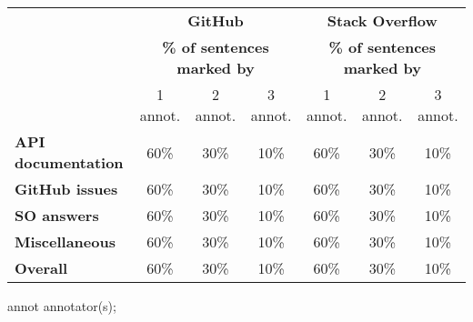 \begin{table}[H]
\centering    
\caption{}
\label{tbl:corpus-annotation-overlap-by-task}
\begin{scriptsize}
\begin{threeparttable}
\begin{tabular}{lcccccc}



& \multicolumn{3}{c}{\textbf{GitHub}} & \multicolumn{3}{c}{\textbf{Stack Overflow}} \\

& \multicolumn{3}{c}{\textbf{\% of sentences marked by}} & \multicolumn{3}{c}{\textbf{\% of sentences marked by}}
\\ \cmidrule(l){2-4}  \cmidrule(l){5-7} 

&  1 annot. &  2 annot. &  3 annot. 
%
&  1 annot. &  2 annot. &  3 annot. 
\\

\hline

\textbf{API documentation} 
& 60\% & 30\% & 10\% %
& 60\% & 30\% & 10\% %
\\
\textbf{GitHub issues} 
& 60\% & 30\% & 10\% %
& 60\% & 30\% & 10\% %
\\
\textbf{SO answers} 
& 60\% & 30\% & 10\% %
& 60\% & 30\% & 10\% %
\\
\textbf{Miscellaneous} 
& 60\% & 30\% & 10\% %
& 60\% & 30\% & 10\% %
\\

\hline
\textbf{Overall} 
& 60\% & 30\% & 10\% %
& 60\% & 30\% & 10\% %
\\
\hline

\end{tabular}
\begin{tablenotes}
    \item[annot] annotator(s);
\end{tablenotes}
\end{threeparttable}
\end{scriptsize}
\end{table}

